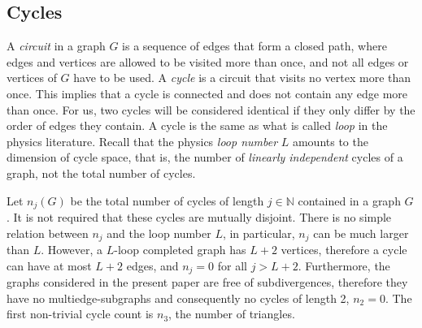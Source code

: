 \documentclass[11pt]{scrartcl}
\numberwithin{equation}{section}
\begin{document}
\subsection{Cycles}\label{sec:cycles}




A \emph{circuit} in a graph $G$ is a sequence of edges that form a closed path, where edges and vertices are allowed to be visited more than once, and not all edges or vertices of $G$ have to be used.
A \emph{cycle} is a circuit that visits no vertex more than once. This implies that a cycle is connected and does not contain any edge more than once. For us, two cycles will be considered identical if they only differ by the order of edges they contain. A cycle is the same as what is called \emph{loop} in the physics literature. Recall that the physics   \emph{loop number} $L$ amounts to the dimension of cycle space, that is, the number of \emph{linearly independent} cycles of a graph, not the total number of cycles. 

Let $n_j(G)$ be the total number of cycles of length $j\in \mathbb N$ contained in a graph $G$.   It is not required that these cycles are mutually disjoint.  There is no simple relation between $n_j$ and the loop number $L$, in particular,     $n_j$ can be much larger than  $L$. However, a $L$-loop completed graph has $L+2$ vertices, therefore a cycle can have at most $L+2$ edges, and $n_j=0$ for all $j>L+2$. Furthermore, the graphs considered in the present paper are free of subdivergences, therefore they have no multiedge-subgraphs and consequently no cycles of length 2, $n_2=0$. The first non-trivial cycle count is $n_3$, the number of triangles. 
\end{document}
